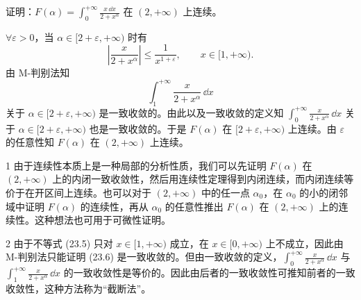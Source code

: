 \begin{xexample}[23.2.6]
证明：$F(\alpha)=\displaystyle\int_0^{+\infty}\frac{x\,\dd x}{2+x^\alpha}$ 在 $(2,+\infty)$ 上连续。
\end{xexample}
\begin{xproof}
$\forall\varepsilon>0$，当 $\alpha\in[2+\varepsilon,+\infty)$ 时有
\begin{equation}
  \left|\frac{x}{2+x^\alpha}\right|\leqslant\frac1{x^{1+\varepsilon}},
  \qquad x\in[1,+\infty).
  \tag{23.5}
\end{equation}
由 M-判别法知
\begin{equation}
  \int_1^{+\infty}\frac{x}{2+x^\alpha}\,\dd x
  \tag{23.6}
\end{equation}
关于 $\alpha\in[2+\varepsilon,+\infty)$ 是一致收敛的。由此以及一致收敛的定义知 $\displaystyle\int_0^{+\infty}\frac{x}{2+x^\alpha}\,\dd x$ 关于 $\alpha\in[2+\varepsilon,+\infty)$ 也是一致收敛的。于是 $F(\alpha)$ 在 $[2+\varepsilon,+\infty)$ 上连续。由 $\varepsilon$ 的任意性知 $F(\alpha)$ 在 $(2,+\infty)$ 上连续。
\end{xproof}

\begin{xremark}
1 由于连续性本质上是一种局部的分析性质，我们可以先证明 $F(\alpha)$ 在 $(2,+\infty)$ 上的内闭一致收敛性，然后用连续性定理得到内闭连续，而内闭连续等价于在开区间上连续。也可以对于 $(2,+\infty)$ 中的任一点 $\alpha_0$，在 $\alpha_0$ 的小的闭邻域中证明 $F(\alpha)$ 的连续性，再从 $\alpha_0$ 的任意性推出 $F(\alpha)$ 在 $(2,+\infty)$ 上的连续性。这种想法也可用于可微性证明。
\end{xremark}

\begin{xremark}
2 由于不等式 (23.5) 只对 $x\in[1,+\infty)$ 成立，在 $x\in[0,+\infty)$ 上不成立，因此由 M-判别法只能证明 (23.6) 是一致收敛的。但由一致收敛的定义，$\displaystyle\int_0^{+\infty}\frac{x}{2+x^\alpha}\,\dd x$ 与 $\displaystyle\int_1^{+\infty}\frac{x}{2+x^\alpha}\,\dd x$ 的一致收敛性是等价的。因此由后者的一致收敛性可推知前者的一致收敛性，这种方法称为“截断法”。
\end{xremark}

